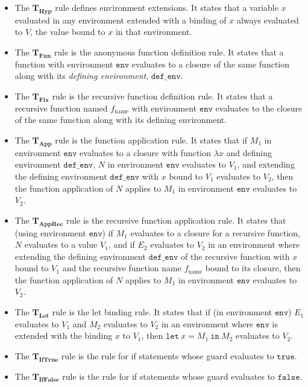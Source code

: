 \documentclass[pageno]{jpaper}
\newcommand{\env}{\mathtt{env}}
\newcommand{\mt}[1]{\mathtt{#1}}
\newcommand{\rulename}[2]{$\boldsymbol{#1}_{\textbf{#2}}$}
\begin{document}
\begin{itemize}
  \item The \rulename{T}{Hyp} rule defines environment extensions. It states that a variable $x$ evaluated in any environment extended with a binding of $x$ always evaluated to $V$, the value bound to $x$ in that environment.
  \item The \rulename{T}{Fun} rule is the anonymous function definition rule. It states that a function with environment $\env$ evaluates to a closure of the same function along with its \emph{defining environment}, $\mt{def\_env}$.
  \item The \rulename{T}{Fix} rule is the recursive function definition rule. It states that a recursive function named $f_{\textrm{name}}$ with environment $\env$ evaluates to the closure of the same function along with its defining environment.
  \item The \rulename{T}{App} rule is the function application rule. It states that if $M_1$ in environment $\env$ evaluates to a closure with function $\lambda x$ and defining environment $\mt{def\_env}$, $N$ in environment $\env$ evaluates to $V_1$, and extending the defining environment $\mt{def\_env}$ with $x$ bound to $V_1$ evaluates to $V_2$, then the function application of $N$ applies to $M_1$ in environment $\env$ evaluates to $V_2$.
  \item The \rulename{T}{AppRec} rule is the recursive function application rule. It states that (using environment $\env$) if $M_1$ evaluates to a closure for a recursive function, $N$ evaluates to a value $V_1$, and if $E_2$ evaluates to $V_2$ in an environment where extending the defining environment $\mt{def\_env}$ of the recursive function with $x$ bound to $V_1$ and the recursive function name $f_{\textrm{name}}$ bound to its closure, then the function application of $N$ applies to $M_1$ in environment $\env$ evaluates to $V_2$.
  \item The \rulename{T}{Let} rule is the let binding rule. It states that if (in environment $\env$) $E_1$ evaluates to $V_1$ and $M_2$ evaluates to $V_2$ in an environment where $\env$ is extended with the binding $x$ to $V_1$, then $\mt{let} \ x=M_1 \ \mt{in} \ M_2$ evaluates to $V_2$.
  \item The \rulename{T}{IfTrue} rule is the rule for if statements whose guard evaluates to $\mt{true}$.
  \item The \rulename{T}{IfFalse} rule is the rule for if statements whose guard evaluates to $\mt{false}$.
\end{itemize}
\end{document}
